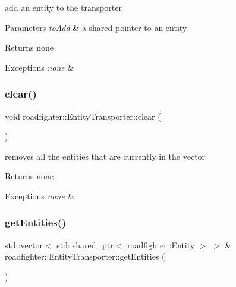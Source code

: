 add an entity to the transporter 
\begin{DoxyParams}{Parameters}
{\em to\+Add} & a shared pointer to an entity \\
\hline
\end{DoxyParams}
\begin{DoxyReturn}{Returns}
none 
\end{DoxyReturn}

\begin{DoxyExceptions}{Exceptions}
{\em none} & \\
\hline
\end{DoxyExceptions}
\mbox{\label{classroadfighter_1_1EntityTransporter_ac0e443566db9213272103952eb697d92}} 
\subsubsection{\texorpdfstring{clear()}{clear()}}
{\footnotesize\ttfamily void roadfighter\+::\+Entity\+Transporter\+::clear (\begin{DoxyParamCaption}{ }\end{DoxyParamCaption})}

removes all the entities that are currently in the vector \begin{DoxyReturn}{Returns}
none 
\end{DoxyReturn}

\begin{DoxyExceptions}{Exceptions}
{\em none} & \\
\hline
\end{DoxyExceptions}
\mbox{\label{classroadfighter_1_1EntityTransporter_ac19204b4b7104561957b3a741fd6ceb5}} 
\subsubsection{\texorpdfstring{get\+Entities()}{getEntities()}}
{\footnotesize\ttfamily std\+::vector$<$ std\+::shared\+\_\+ptr$<$ \hyperlink{classroadfighter_1_1Entity}{roadfighter\+::\+Entity} $>$ $>$ \& roadfighter\+::\+Entity\+Transporter\+::get\+Entities (\begin{DoxyParamCaption}{ }\end{DoxyParamCaption})}

